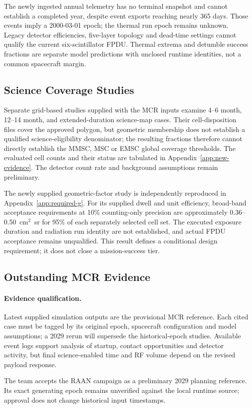 The newly ingested annual telemetry has no terminal snapshot and cannot establish a completed year, despite event exports reaching nearly 365 days. Those events imply a 2000-03-01 epoch; the thermal run epoch remains unknown. Legacy detector efficiencies, five-layer topology and dead-time settings cannot qualify the current six-scintillator FPDU. Thermal extrema and detumble success fractions are separate model predictions with unclosed runtime identities, not a common spacecraft margin.

\subsection{Science Coverage Studies}\label{sec:new-coverage}
Separate grid-based studies supplied with the MCR inputs examine 4--6 month, 12--14 month, and extended-duration science-map cases. Their cell-disposition files cover the approved polygon, but geometric membership does not establish a qualified science-eligibility denominator; the resulting fractions therefore cannot directly establish the MMSC, MSC or EMSC global coverage thresholds. The evaluated cell counts and their status are tabulated in Appendix~\ref{app:new-evidence}. The detector count rate and background assumptions remain preliminary.

The newly supplied geometric-factor study is independently reproduced in Appendix~\ref{app:required-g}. For its supplied dwell and unit efficiency, broad-band acceptance requirements at 10\% counting-only precision are approximately 0.36--0.50~cm$^2$~sr for 95\% of each separately selected cell set. The executed exposure duration and radiation run identity are not established, and actual FPDU acceptance remains unqualified. This result defines a conditional design requirement; it does not close a mission-success tier.

\subsection{Outstanding MCR Evidence}
\paragraph{Evidence qualification.} Latest supplied simulation outputs are the provisional MCR reference. Each cited case must be tagged by its original epoch, spacecraft configuration and model assumptions; a 2029 rerun will supersede the historical-epoch studies. Available event logs support analysis of startup, contact opportunities and detector activity, but final science-enabled time and RF volume depend on the revised payload response.

The team accepts the RAAN campaign as a preliminary 2029 planning reference. Its exact generating epoch remains unverified against the local runtime source; approval does not change historical input timestamps.

